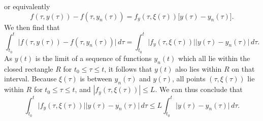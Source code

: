 \documentclass{myart}
\begin{document}
or equivalently
\begin{equation*}
  f(\tau, y(\tau)) - f(\tau, y_n(\tau))
= f_y(\tau, \xi(\tau)) \Big[y(\tau) - y_n(\tau)\Big].
\end{equation*}
We then find that
\begin{equation*}
  \int_{t_0}^t \Big|f(\tau, y(\tau)) - f(\tau, y_n(\tau))\Big| \,d\tau
= \int_{t_0}^t \Big|f_y(\tau, \xi(\tau))\Big|
               \Big|y(\tau) - y_n(\tau)\Big| \,d\tau.
\end{equation*}
As $y(t)$ is the limit of a sequence of functions $y_n(t)$ which all
lie within the closed rectangle $R$ for $t_0 \leq \tau \leq t$, it
follows that $y(t)$ also lies within $R$ on that interval. Because
$\xi(\tau)$ is between $y_n(\tau)$ and $y(\tau)$, all points $(\tau,
\xi(\tau))$ lie within $R$ for $t_0 \leq \tau \leq t$, and $|f_y(\tau,
\xi(\tau))| \leq L$. We can thus conclude that
\begin{equation*}
     \int_{t_0}^t \Big|f_y(\tau, \xi(\tau))\Big|
                  \Big|y(\tau) - y_n(\tau)\Big| \,d\tau
\leq L \int_{t_0}^t \Big|y(\tau) - y_n(\tau)\Big| \,d\tau.
\end{equation*}
\end{document}
